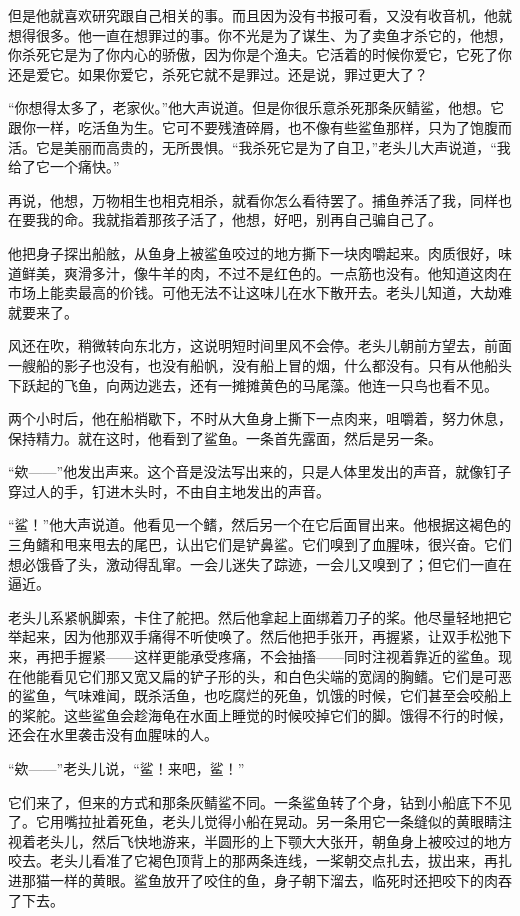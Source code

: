 \documentclass[12pt,UTF-8,openany]{ctexbook}
\begin{document}
\begin{normalsize}
    但是他就喜欢研究跟自己相关的事。而且因为没有书报可看，又没有收音机，他就想得很多。他一直在想罪过的事。你不光是为了谋生、为了卖鱼才杀它的，他想，你杀死它是为了你内心的骄傲，因为你是个渔夫。它活着的时候你爱它，它死了你还是爱它。如果你爱它，杀死它就不是罪过。还是说，罪过更大了？
    
    “你想得太多了，老家伙。”他大声说道。但是你很乐意杀死那条灰鲭鲨，他想。它跟你一样，吃活鱼为生。它可不要残渣碎屑，也不像有些鲨鱼那样，只为了饱腹而活。它是美丽而高贵的，无所畏惧。“我杀死它是为了自卫，”老头儿大声说道，“我给了它一个痛快。”
    
    再说，他想，万物相生也相克相杀，就看你怎么看待罢了。捕鱼养活了我，同样也在要我的命。我就指着那孩子活了，他想，好吧，别再自己骗自己了。
    
    他把身子探出船舷，从鱼身上被鲨鱼咬过的地方撕下一块肉嚼起来。肉质很好，味道鲜美，爽滑多汁，像牛羊的肉，不过不是红色的。一点筋也没有。他知道这肉在市场上能卖最高的价钱。可他无法不让这味儿在水下散开去。老头儿知道，大劫难就要来了。
    
    风还在吹，稍微转向东北方，这说明短时间里风不会停。老头儿朝前方望去，前面一艘船的影子也没有，也没有船帆，没有船上冒的烟，什么都没有。只有从他船头下跃起的飞鱼，向两边逃去，还有一摊摊黄色的马尾藻。他连一只鸟也看不见。
    
    两个小时后，他在船梢歇下，不时从大鱼身上撕下一点肉来，咀嚼着，努力休息，保持精力。就在这时，他看到了鲨鱼。一条首先露面，然后是另一条。
    
    “欸——”他发出声来。这个音是没法写出来的，只是人体里发出的声音，就像钉子穿过人的手，钉进木头时，不由自主地发出的声音。
    
    “鲨！”他大声说道。他看见一个鳍，然后另一个在它后面冒出来。他根据这褐色的三角鳍和甩来甩去的尾巴，认出它们是铲鼻鲨。它们嗅到了血腥味，很兴奋。它们想必饿昏了头，激动得乱窜。一会儿迷失了踪迹，一会儿又嗅到了；但它们一直在逼近。
    
    老头儿系紧帆脚索，卡住了舵把。然后他拿起上面绑着刀子的桨。他尽量轻地把它举起来，因为他那双手痛得不听使唤了。然后他把手张开，再握紧，让双手松弛下来，再把手握紧——这样更能承受疼痛，不会抽搐——同时注视着靠近的鲨鱼。现在他能看见它们那又宽又扁的铲子形的头，和白色尖端的宽阔的胸鳍。它们是可恶的鲨鱼，气味难闻，既杀活鱼，也吃腐烂的死鱼，饥饿的时候，它们甚至会咬船上的桨舵。这些鲨鱼会趁海龟在水面上睡觉的时候咬掉它们的脚。饿得不行的时候，还会在水里袭击没有血腥味的人。
    
    “欸——”老头儿说，“鲨！来吧，鲨！”
    
    它们来了，但来的方式和那条灰鲭鲨不同。一条鲨鱼转了个身，钻到小船底下不见了。它用嘴拉扯着死鱼，老头儿觉得小船在晃动。另一条用它一条缝似的黄眼睛注视着老头儿，然后飞快地游来，半圆形的上下颚大大张开，朝鱼身上被咬过的地方咬去。老头儿看准了它褐色顶背上的那两条连线，一桨朝交点扎去，拔出来，再扎进那猫一样的黄眼。鲨鱼放开了咬住的鱼，身子朝下溜去，临死时还把咬下的肉吞了下去。
    

\end{normalsize}
\end{document}
